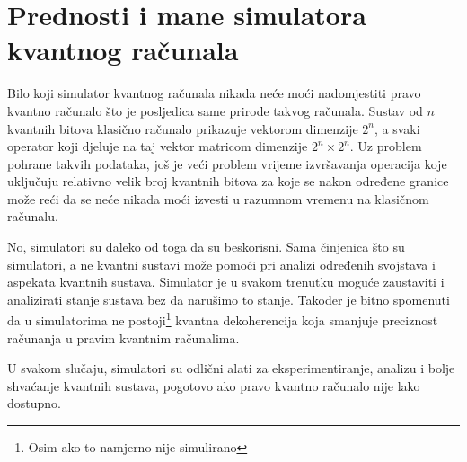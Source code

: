 \section{Prednosti i mane simulatora kvantnog računala}

Bilo koji simulator kvantnog računala nikada neće moći nadomjestiti pravo kvantno računalo što je posljedica same prirode takvog računala. Sustav od $n$ kvantnih bitova klasično računalo prikazuje vektorom dimenzije $2^n$, a svaki operator koji djeluje na taj vektor matricom dimenzije $2^n \times 2^n$. Uz problem pohrane takvih podataka, još je veći problem vrijeme izvršavanja operacija koje uključuju relativno velik broj kvantnih bitova za koje se nakon određene granice može reći da se neće nikada moći izvesti u razumnom vremenu na klasičnom računalu.

No, simulatori su daleko od toga da su beskorisni. Sama činjenica što su simulatori, a ne kvantni sustavi može pomoći pri analizi određenih svojstava i aspekata kvantnih sustava. Simulator je u svakom trenutku moguće zaustaviti i analizirati stanje sustava bez da narušimo to stanje. Također je bitno spomenuti da u simulatorima ne postoji\footnote{Osim ako to namjerno nije simulirano} kvantna dekoherencija koja smanjuje preciznost računanja u pravim kvantnim računalima.

U svakom slučaju, simulatori su odlični alati za eksperimentiranje, analizu i bolje shvaćanje kvantnih sustava, pogotovo ako pravo kvantno računalo nije lako dostupno.





























